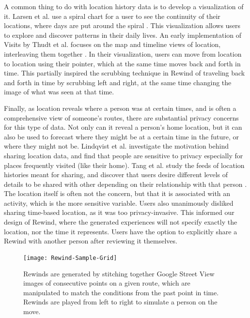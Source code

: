 \documentclass{sigchi}
\begin{document}
A common thing to do with location history data is to develop a visualization of it. Larsen et al. use a spiral chart for a user to see the continuity of their locations, where days are put around the spiral \cite{larsen2013qs}. This visualization allows users to explore and discover patterns in their daily lives. An early implementation of Visits by Thudt et al. focuses on the map and timeline views of location, interleaving them together \cite{thudt2013visits}. In their visualization, users can move from location to location using their pointer, which at the same time moves back and forth in time. This partially inspired the scrubbing technique in Rewind of traveling back and forth in time by scrubbing left and right, at the same time changing the image of what was seen at that time.
 
Finally, as location reveals where a person was at certain times, and is often a comprehensive view of someone's routes, there are substantial privacy concerns for this type of data. Not only can it reveal a person's home location, but it can also be used to forecast where they might be at a certain time in the future, or where they might not be. Lindqvist et al. \cite{lindqvist2011m} investigate the motivation behind sharing location data, and find that people are sensitive to privacy especially for places frequently visited (like their home). Tang et al. study the feeds of location histories meant for sharing, and discover that users desire different levels of details to be shared with other depending on their relationship with that person \cite{tang2011understanding}. The location itself is often not the concern, but that it is associated with an activity, which is the more sensitive variable. Users also unanimously disliked sharing time-based location, as it was too privacy-invasive. This informed our design of Rewind, where the generated experiences will not specify exactly the location, nor the time it represents. Users have the option to explicitly share a Rewind with another person after reviewing it themselves.

\begin{figure}[h]
   \centering
     \texttt{[image: Rewind-Sample-Grid]}
     \caption{Rewinds are generated by stitching together Google Street View images of consecutive points on a given route, which are manipulated to match the conditions from the past point in time. Rewinds are played from left to right to simulate a person on the move.}
     \label{fig:rewinds}
\end{figure}
\end{document}

